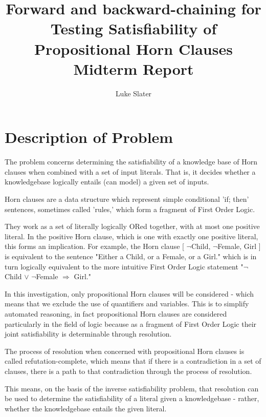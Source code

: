 \documentclass{article}
\begin{document}
\title{Forward and backward-chaining for Testing Satisfiability of Propositional Horn Clauses \protect\\ Midterm Report}
\author{Luke Slater}

\maketitle

\section{Description of Problem}

The problem concerns determining the satisfiability of a knowledge base of Horn
clauses when combined with a set of input literals. That is, it decides whether
a knowledgebase logically entails (can model) a given set of inputs.

Horn clauses are a data structure which represent simple conditional 'if; then'
sentences, sometimes called 'rules,' which form a fragment of First Order Logic.

They work as a set of literally logically ORed together, with at most one
positive literal. In the positive Horn clause, which is one with exactly one
positive literal, this forms an implication. For example, the Horn clause 
[ $\neg$Child, $\neg$Female, Girl ] is equivalent to the sentence "Either a
Child, or a Female, or a Girl." which is in turn logically equivalent to the
more intuitive First Order Logic statement 
"$\neg$Child $\vee$ $\neg$Female $\Rightarrow$ Girl."

In this investigation, only propositional Horn clauses will be considered -
which means that we exclude the use of quantifiers and variables. This is to
simplify automated reasoning, in fact propositional Horn clauses are considered
particularly in the field of logic because as a fragment of First Order Logic 
their joint satisfiability is determinable through resolution.

The process of resolution when concerned with propositional Horn clauses is
called refutation-complete\cite{refcomp}, which means that if there is a
contradiction in a set of clauses, there is a path to that contradiction through
the process of resolution.\cite{resolution}

This means, on the basis of the inverse satisfiability problem\cite{invsat},
that resolution can be used to determine the satisfiability of a
literal given a knowledgebase - rather, whether the knowledgebase entails the
given literal.
\end{document}
